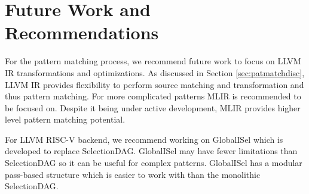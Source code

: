 \section{Future Work and Recommendations}
For the pattern matching process, we recommend future work to focus on LLVM IR transformations and optimizations. As discussed in Section \ref{sec:patmatchdisc}, LLVM IR provides flexibility to perform source matching and transformation and thus pattern matching. For more complicated patterns MLIR is recommended to be focused on. Despite it being under active development, MLIR provides higher level pattern matching potential.

For LLVM RISC-V backend, we recommend working on GlobalISel which is developed to replace SelectionDAG. GlobalISel may have fewer limitations than SelectionDAG so it can be useful for complex patterns. GlobalISel has a modular pass-based structure which is easier to work with than the monolithic SelectionDAG.

